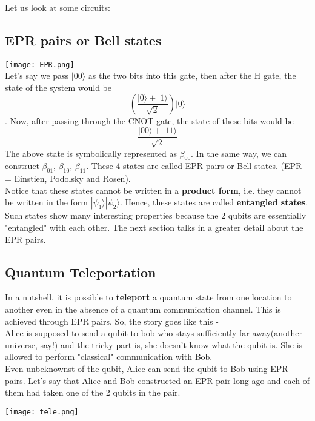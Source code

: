 \documentclass{article}
\begin{document}
Let us look at some circuits: 
\subsection{EPR pairs or Bell states}

\texttt{[image: EPR.png]}\\[3pt]
Let's say we pass $|00 \rangle$ as the two bits into this gate, then after the H gate, the state of the system would be
$$\displaystyle{\left( \frac{|0 \rangle + |1 \rangle}{\sqrt{2}} \right)|0 \rangle}$$. Now, after passing through the CNOT gate, the state of these bits would be
$$\displaystyle{\frac{|00 \rangle + |11 \rangle}{\sqrt{2}} }$$
The above state is symbolically represented as $\beta _{00}$. In the same way, we can construct $\beta _{01}$, $\beta _{10}$, $\beta _{11}$. These 4 states are called EPR pairs or Bell states. (EPR = Einstien, Podolsky and Rosen). \\[3pt]
Notice that these states cannot be written in a \textbf{product form}, i.e. they cannot be written in the form $|\psi _1 \rangle |\psi _2 \rangle$. Hence, these states are called \textbf{entangled states}. Such states show many interesting properties because the 2 qubits are essentially "entangled" with each other. The next section talks in a greater detail about the EPR pairs.

\subsection{Quantum Teleportation}
In a nutshell, it is possible to \textbf{teleport} a quantum state from one location to another even in the absence of a quantum communication channel. This is achieved through EPR pairs. So, the story goes like this - \\[3pt]
Alice is supposed to send a qubit to bob who stays sufficiently far away(another universe, say!) and the tricky part is, she doesn't know what the qubit is. She is allowed to perform "classical" communication with Bob. \\[3pt]
Even unbeknownst of the qubit, Alice can send the qubit to Bob using EPR pairs. Let's say that Alice and Bob constructed an EPR pair long ago and each of them had taken one of the 2 qubits in the pair.

\texttt{[image: tele.png]}
\end{document}
